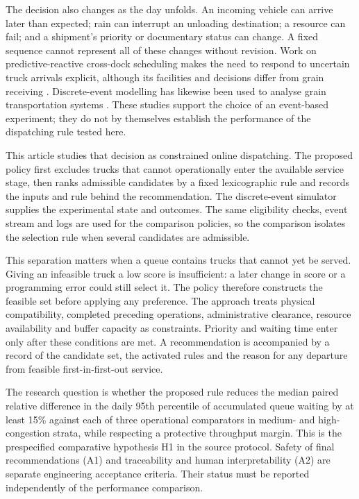\documentclass[12pt,a4paper]{article}
\begin{document}
The decision also changes as the day unfolds. An incoming vehicle can arrive later than expected; rain can interrupt an unloading destination; a resource can fail; and a shipment's priority or documentary status can change. A fixed sequence cannot represent all of these changes without revision. Work on predictive-reactive cross-dock scheduling makes the need to respond to uncertain truck arrivals explicit, although its facilities and decisions differ from grain receiving \parencite{nasiriPredictivereactiveCrossdockRescheduling2022}. Discrete-event modelling has likewise been used to analyse grain transportation systems \parencite{turnerDiscreteEventSimulation2019a}. These studies support the choice of an event-based experiment; they do not by themselves establish the performance of the dispatching rule tested here.

This article studies that decision as constrained online dispatching. The proposed policy first excludes trucks that cannot operationally enter the available service stage, then ranks admissible candidates by a fixed lexicographic rule and records the inputs and rule behind the recommendation. The discrete-event simulator supplies the experimental state and outcomes. The same eligibility checks, event stream and logs are used for the comparison policies, so the comparison isolates the selection rule when several candidates are admissible.

This separation matters when a queue contains trucks that cannot yet be served. Giving an infeasible truck a low score is insufficient: a later change in score or a programming error could still select it. The policy therefore constructs the feasible set before applying any preference. The approach treats physical compatibility, completed preceding operations, administrative clearance, resource availability and buffer capacity as constraints. Priority and waiting time enter only after these conditions are met. A recommendation is accompanied by a record of the candidate set, the activated rules and the reason for any departure from feasible first-in-first-out service.

The research question is whether the proposed rule reduces the median paired relative difference in the daily 95th percentile of accumulated queue waiting by at least 15\% against each of three operational comparators in medium- and high-congestion strata, while respecting a protective throughput margin. This is the prespecified comparative hypothesis H1 in the source protocol. Safety of final recommendations (A1) and traceability and human interpretability (A2) are separate engineering acceptance criteria. Their status must be reported independently of the performance comparison.
\end{document}
